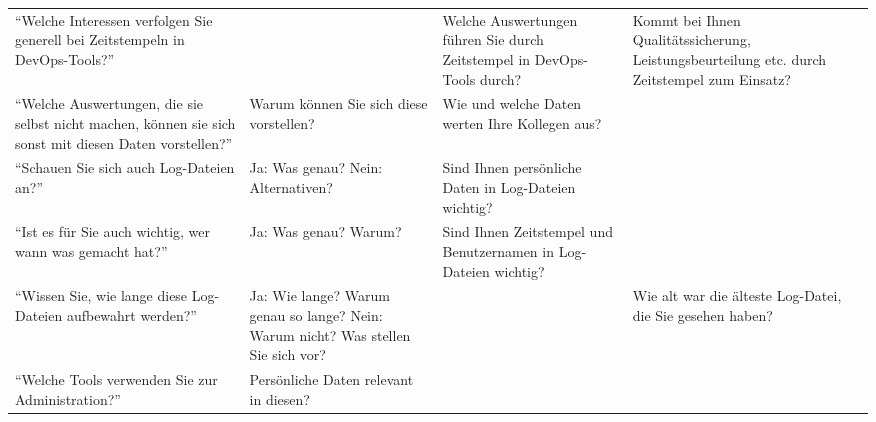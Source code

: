\begin{table*}
{\begin{tabularx}{\linewidth}{XXXX}
        \enquote{Welche Interessen verfolgen Sie generell bei Zeitstempeln in DevOps-Tools?}                                &                                                                                       & Welche Auswertungen führen Sie durch Zeitstempel in DevOps-Tools durch?                                                       & Kommt bei Ihnen Qualitätssicherung, Leistungsbeurteilung etc. durch Zeitstempel zum Einsatz?  \\
        \enquote{Welche Auswertungen, die sie selbst nicht machen, können sie sich sonst mit diesen Daten vorstellen?}      & Warum können Sie sich diese vorstellen?                                               & Wie und welche Daten werten Ihre Kollegen aus?                                                                                &                                                                                               \\
        \enquote{Schauen Sie sich auch Log-Dateien an?}                                                                     & Ja: Was genau? Nein: Alternativen?                                                    & Sind Ihnen persönliche Daten in Log-Dateien wichtig?                                                                          &                                                                                               \\
        \enquote{Ist es für Sie auch wichtig, wer wann was gemacht hat?}                                                    & Ja: Was genau? Warum?                                                                 & Sind Ihnen Zeitstempel und Benutzernamen in Log-Dateien wichtig?                                                              &                                                                                               \\
        \enquote{Wissen Sie, wie lange diese Log-Dateien aufbewahrt werden?}                                                & Ja: Wie lange? Warum genau so lange? Nein: Warum nicht? Was stellen Sie sich vor?     &                                                                                                                               & Wie alt war die älteste Log-Datei, die Sie gesehen haben?                                     \\
        \enquote{Welche Tools verwenden Sie zur Administration?}                                                            & Persönliche Daten relevant in diesen?                                                 &                                                                                                                               &                                                                                               \\

\end{tabularx}}
\end{table*}
